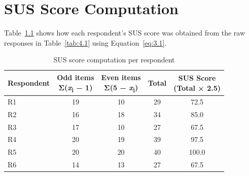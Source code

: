 \chapter[SUS SCORE COMPUTATION]{SUS Score Computation}\label{app:D}

Table~\ref{tab:D.1} shows how each respondent's SUS score was obtained from the
raw responses in Table~\ref{tab:4.1} using Equation~\ref{eq:3.1}.

\begin{table}[htbp]
\centering
\singlespacing
\caption{SUS score computation per respondent}\label{tab:D.1}
\renewcommand{\arraystretch}{1.15}
\begin{tabular}{lcccc}
\toprule
\textbf{Respondent} & \makecell{\textbf{Odd items}\\
\textbf{Σ(\emph{x}\textsubscript{i} − 1)}} & \makecell{\textbf{Even items}\\
\textbf{Σ(5 − \emph{x}\textsubscript{i})}} & \textbf{Total} & \makecell{\textbf{SUS Score}\\
\textbf{(Total × 2.5)}} \\
\midrule
R1 & 19 & 10 & 29 & 72.5 \\
R2 & 16 & 18 & 34 & 85.0 \\
R3 & 17 & 10 & 27 & 67.5 \\
R4 & 20 & 19 & 39 & 97.5 \\
R5 & 20 & 20 & 40 & 100.0 \\
R6 & 14 & 13 & 27 & 67.5 \\
\bottomrule
\end{tabular}
\end{table}
